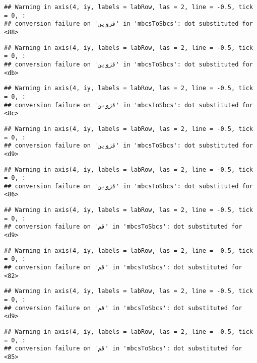 \documentclass[
]{article}
\begin{document}
\begin{verbatim}
## Warning in axis(4, iy, labels = labRow, las = 2, line = -0.5, tick = 0, :
## conversion failure on 'قزوین' in 'mbcsToSbcs': dot substituted for <88>
\end{verbatim}

\begin{verbatim}
## Warning in axis(4, iy, labels = labRow, las = 2, line = -0.5, tick = 0, :
## conversion failure on 'قزوین' in 'mbcsToSbcs': dot substituted for <db>
\end{verbatim}

\begin{verbatim}
## Warning in axis(4, iy, labels = labRow, las = 2, line = -0.5, tick = 0, :
## conversion failure on 'قزوین' in 'mbcsToSbcs': dot substituted for <8c>
\end{verbatim}

\begin{verbatim}
## Warning in axis(4, iy, labels = labRow, las = 2, line = -0.5, tick = 0, :
## conversion failure on 'قزوین' in 'mbcsToSbcs': dot substituted for <d9>
\end{verbatim}

\begin{verbatim}
## Warning in axis(4, iy, labels = labRow, las = 2, line = -0.5, tick = 0, :
## conversion failure on 'قزوین' in 'mbcsToSbcs': dot substituted for <86>
\end{verbatim}

\begin{verbatim}
## Warning in axis(4, iy, labels = labRow, las = 2, line = -0.5, tick = 0, :
## conversion failure on 'قم' in 'mbcsToSbcs': dot substituted for <d9>
\end{verbatim}

\begin{verbatim}
## Warning in axis(4, iy, labels = labRow, las = 2, line = -0.5, tick = 0, :
## conversion failure on 'قم' in 'mbcsToSbcs': dot substituted for <82>
\end{verbatim}

\begin{verbatim}
## Warning in axis(4, iy, labels = labRow, las = 2, line = -0.5, tick = 0, :
## conversion failure on 'قم' in 'mbcsToSbcs': dot substituted for <d9>
\end{verbatim}

\begin{verbatim}
## Warning in axis(4, iy, labels = labRow, las = 2, line = -0.5, tick = 0, :
## conversion failure on 'قم' in 'mbcsToSbcs': dot substituted for <85>
\end{verbatim}
\end{document}
